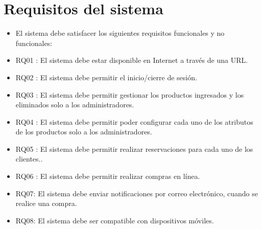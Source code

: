 \documentclass{article}
\begin{document}
	\section{Requisitos del sistema}
	\begin{itemize}
		\item El sistema debe satisfacer los siguientes requisitos funcionales y no funcionales:
		\item RQ01 : El sistema debe estar disponible en Internet a través de una URL.
		\item RQ02 : El sistema debe permitir el inicio/cierre de sesión.
		\item RQ03 : El sistema debe permitir gestionar los productos ingresados y los eliminados solo a los administradores.
		\item RQ04 : El sistema debe permitir poder configurar cada uno de los atributos de los productos solo a los administradores.
		\item RQ05 : El sistema debe permitir realizar reservaciones para cada uno de los clientes..
		\item RQ06 : El sistema debe permitir realizar compras en línea.
  	\item RQ07: El sistema debe enviar 
        notificaciones por correo electrónico, cuando se realice una compra.
		\item RQ08: El sistema debe ser compatible con dispositivos móviles.
	\end{itemize}
	
\end{document}
